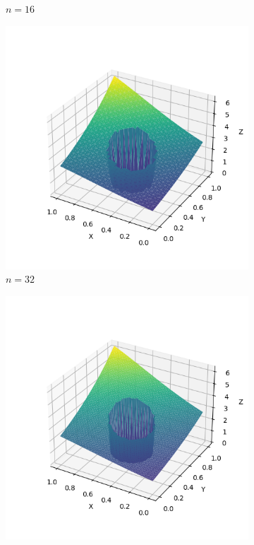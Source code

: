 \documentclass[lang=cn,a4paper,newtx,bibend=bibtex]{elegantpaper}
\begin{document}
\begin{figure}[H]
\begin{subfigure}[b]{0.18\textwidth}
      \caption{$n= 16$}
  \end{subfigure}
  \hfill
  \begin{subfigure}[b]{0.18\textwidth}
      \includegraphics[width=\textwidth]{../../res_bac/res-[data|1-Neumann-irregular-c32].png}
      \caption{$n = 32$}
  \end{subfigure}
  \hfill
  \begin{subfigure}[b]{0.18\textwidth}
      \includegraphics[width=\textwidth]{../../res_bac/res-[data|1-Neumann-irregular-d64].png}

\end{subfigure}
\end{figure}
\end{document}
